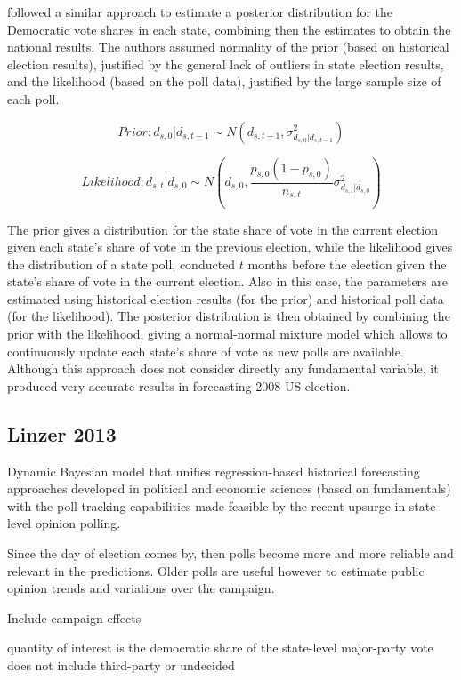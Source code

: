 \documentclass[
  12pt]{article}
\begin{document}
\citep{loc:gel:2010} followed a similar approach to estimate a posterior
distribution for the Democratic vote shares in each state, combining
then the estimates to obtain the national results. The authors assumed
normality of the prior (based on historical election results), justified
by the general lack of outliers in state election results, and the
likelihood (based on the poll data), justified by the large sample size
of each poll.

\[Prior: d_{s,0}|d_{s,t-1} \sim N(d_{s,t-1}, \sigma^2_{d_{s,0}|d_{s,t-1}})\]

\[Likelihood: d_{s,t}|d_{s,0} \sim N(d_{s,0}, \frac{p_{s,0}(1-p_{s,0})}{n_{s,t}} \sigma^2_{d_{s,t}|d_{s,0}})\]

The prior gives a distribution for the state share of vote in the
current election given each state's share of vote in the previous
election, while the likelihood gives the distribution of a state poll,
conducted \(t\) months before the election given the state's share of
vote in the current election. Also in this case, the parameters are
estimated using historical election results (for the prior) and
historical poll data (for the likelihood). The posterior distribution is
then obtained by combining the prior with the likelihood, giving a
normal-normal mixture model which allows to continuously update each
state's share of vote as new polls are available. Although this approach
does not consider directly any fundamental variable, it produced very
accurate results in forecasting 2008 US election.

\hypertarget{linzer-2013}{%
\subsection{Linzer 2013}\label{linzer-2013}}

\citep{lin:2013}

Dynamic Bayesian model that unifies regression-based historical
forecasting approaches developed in political and economic sciences
(based on fundamentals) with the poll tracking capabilities made
feasible by the recent upsurge in state-level opinion polling.

Since the day of election comes by, then polls become more and more
reliable and relevant in the predictions. Older polls are useful however
to estimate public opinion trends and variations over the campaign.

Include campaign effects

quantity of interest is the democratic share of the state-level
major-party vote does not include third-party or undecided
\end{document}
